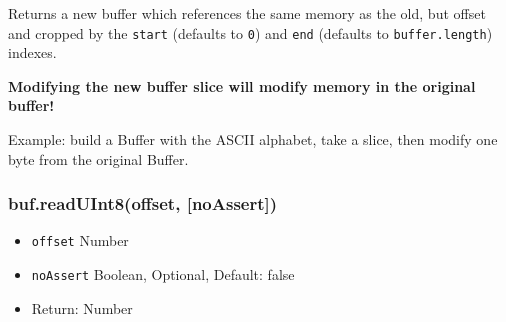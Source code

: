 Returns a new buffer which references the same memory as the old, but
offset and cropped by the \texttt{start} (defaults to \texttt{0}) and
\texttt{end} (defaults to \texttt{buffer.length}) indexes.

\textbf{Modifying the new buffer slice will modify memory in the
original buffer!}

Example: build a Buffer with the ASCII alphabet, take a slice, then
modify one byte from the original Buffer.

\begin{Shaded}
\begin{Highlighting}[]
  \NormalTok{);}

 \NormalTok{(}   
  \NormalTok{; }
\NormalTok{\}}

 \NormalTok{(}\NormalTok{, }\NormalTok{);}
\NormalTok{(}\NormalTok{(}\NormalTok{, }\NormalTok{, }\NormalTok{));}
\NormalTok{buf1[}\NormalTok{] = }\NormalTok{;}
\NormalTok{(}\NormalTok{(}\NormalTok{, }\NormalTok{, }\NormalTok{));}

\end{Highlighting}
\end{Shaded}

\subsubsection{buf.readUInt8(offset, {[}noAssert{]})}

\begin{itemize}
\item
  \texttt{offset} Number
\item
  \texttt{noAssert} Boolean, Optional, Default: false
\item
  Return: Number
\end{itemize}

